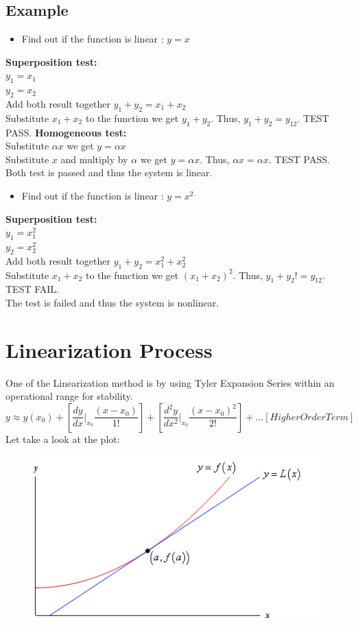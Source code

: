 \documentclass[12pt,a4paper]{article}
\begin{document}
	\subsection{Example}
	
	\begin{itemize}
		\item Find out if the function is linear : \(y = x\)
	\end{itemize}
	\textbf{Superposition test:} \\
	\(y_1 = x_1\) \\
	\(y_2 = x_2\) \\
	Add both result together \(y_1 + y_2 = x_1 + x_2\) \\
	Substitute \(x_1 + x_2\) to the function we get \(y_1+y_2\). Thus, \(y_1+y_2=y_{12}\). TEST PASS.
	\textbf{Homogeneous test:} \\
	Substitute \(\alpha x\) we get \(y = \alpha x\) \\
	Substitute \(x\) and multiply by \(\alpha\) we get \(y = \alpha x\). Thus, \(\alpha x=\alpha x\). TEST PASS. \\
	Both test is passed and thus the system is linear.
	
	\begin{itemize}
		\item Find out if the function is linear : \(y = x^2\)
	\end{itemize}
	\textbf{Superposition test:} \\
	\(y_1 = x_1^2\) \\
	\(y_2 = x_2^2\) \\
	Add both result together \(y_1 + y_2 = x_1^2 + x_2^2\) \\
	Substitute \(x_1 + x_2\) to the function we get \((x_1+x_2)^2\). Thus, \(y_1+y_2!=y_{12}\). TEST FAIL. \\
	The test is failed and thus the system is nonlinear.
	
	\break
	
	
	\section{Linearization Process}
	One of the Linearization method is by using Tyler Expansion Series within an operational range for stability.
	\[
	y \approx y(x_0) + \left[\frac{dy}{dx}|_{x_0}\frac{(x-x_0)}{1!}\right] + \left[\frac{d^2y}{dx^2}|_{x_0}\frac{(x-x_0)^2}{2!}\right] + ... [Higher Order Term]
	\]
	Let take a look at the plot:
	
	\begin{figure}[h]
		\centering
		\includegraphics[width=0.7\linewidth]{src/fig1}
		\label{fig:Plot}
	\end{figure}
	
\end{document}
